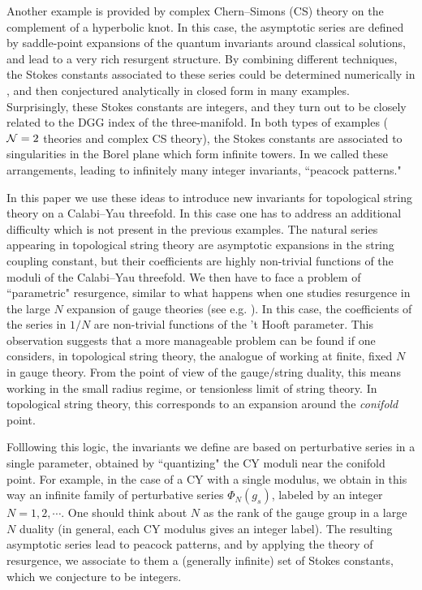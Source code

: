\documentclass[a4paper,11pt]{article}
\theoremstyle{definition}
\newcommand{\CN}{{\cal N}}
\begin{document}
Another example is provided by complex Chern--Simons (CS) theory on the complement of a hyperbolic knot. 
In this case, the asymptotic series are defined by saddle-point expansions of the quantum invariants around classical solutions, 
and lead to a very rich resurgent structure. By combining different 
techniques, the Stokes constants associated to these series could be determined numerically in \cite{ggm1,ggm2}, and 
then conjectured analytically in closed form in many examples. Surprisingly, these Stokes constants are integers, and they turn out to be 
closely related to the DGG index of the three-manifold. In both types of examples ($\CN=2$ theories and complex CS theory), the Stokes 
constants are associated to singularities in the Borel plane which form infinite towers. In \cite{ggm1,ggm2} we called these arrangements, 
leading to infinitely many integer invariants, ``peacock patterns."

In this paper we use these ideas to introduce new invariants for
topological string theory on a Calabi--Yau threefold. In this case one
has to address an additional difficulty which is not present in the
previous examples. The natural series appearing in topological string
theory are asymptotic expansions in the string coupling constant, but
their coefficients are highly non-trivial functions of the moduli of
the Calabi--Yau threefold. We then have to face a problem of
``parametric" resurgence, similar to what happens when one studies
resurgence in the large $N$ expansion of gauge theories (see
e.g. \cite{mmlargen}). In this case, the coefficients of the series in
$1/N$ are non-trivial functions of the 't Hooft parameter. This
observation suggests that a more manageable problem can be found if
one considers, in topological string theory, the analogue of working
at finite, fixed $N$ in gauge theory. From the point of view of the
gauge/string duality, this means working in the small radius regime,
or tensionless limit of string theory. In topological string theory,
this corresponds to an expansion around the {\it conifold} point.

Folllowing this logic, the invariants we define are based on
perturbative series in a single parameter, obtained by ``quantizing"
the CY moduli near the conifold point. For example, in the case of a
CY with a single modulus, we obtain in this way an infinite family of
perturbative series $\Phi_N(g_s)$, labeled by an integer
$N=1,2, \cdots$. One should think about $N$ as the rank of the gauge
group in a large $N$ duality (in general, each CY modulus gives an
integer label).  The resulting asymptotic series lead to peacock
patterns, and by applying the theory of resurgence, we associate to
them a (generally infinite) set of Stokes constants, which we
conjecture to be integers.
\end{document}
